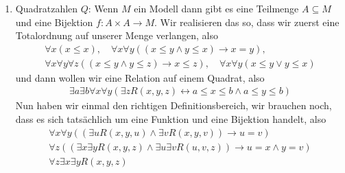 \begin{solution}
\begin{enumerate}[label = \arabic*.]
		\item Quadratzahlen $Q$: Wenn $M$ ein Modell dann gibt es eine Teilmenge $A \subseteq M$ und eine Bijektion $f: A \times A \to M$. Wir realisieren das so, dass wir zuerst eine Totalordnung auf unserer Menge verlangen, also
		\begin{align*}
		\forall x (x \leq x), \quad \forall x \forall y ((x \leq y \land y \leq x) \rightarrow x = y),\\
		\forall x \forall y \forall z((x \leq y \land y \leq z) \rightarrow x \leq z), \quad \forall x \forall y (x \leq y \lor y \leq x)
		\end{align*}
		und dann wollen wir eine Relation auf einem Quadrat, also
		\begin{align*}
		\exists a \exists b \forall x \forall y(\exists zR(x,y,z) \leftrightarrow a \leq x \leq b \land a \leq y \leq b)
		\end{align*}
		Nun haben wir einmal den richtigen Definitionsbereich, wir brauchen noch, dass es sich tatsächlich um eine Funktion und eine Bijektion handelt, also
		\begin{align*}
		\forall x \forall y((\exists u R(x,y,u) \land \exists v R(x,y,v)) \rightarrow u = v) \\
		\forall z ((\exists x \exists y R(x,y,z) \land \exists u \exists v R(u,v,z)) \rightarrow u = x \land y = v) \\
		\forall z \exists x \exists y R(x,y,z)
		\end{align*}
	\end{enumerate}

\end{solution}

